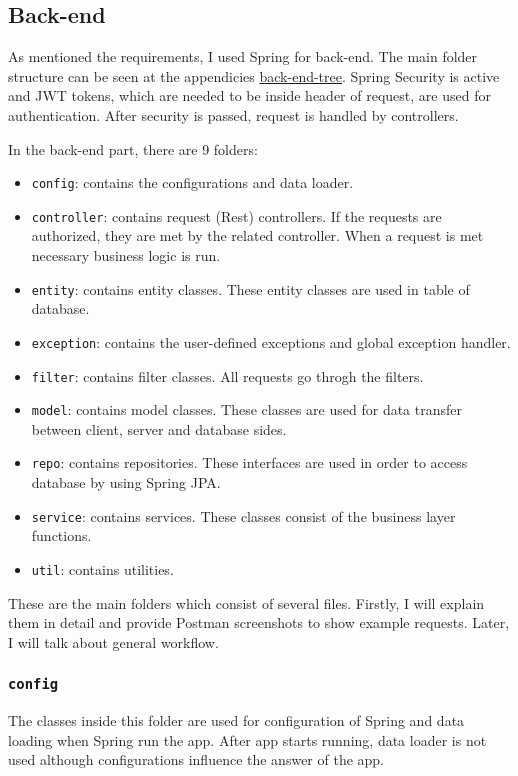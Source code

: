 \subsection{Back-end}

As mentioned the requirements, I used Spring for back-end. The main folder structure can be seen at the appendicies \hyperref[back-end-tree]{back-end-tree}. Spring Security is active and JWT tokens, which are needed to be inside header of request, are used for authentication. After security is passed, request is handled by controllers.

In the back-end part, there are 9 folders:
\begin{itemize}
  \item \texttt{config}: contains the configurations and data loader.
  \item \texttt{controller}: contains request (Rest) controllers. If the requests are authorized, they are met by the related controller. When a request is met necessary business logic is run.
  \item \texttt{entity}: contains entity classes. These entity classes are used in table of database.
  \item \texttt{exception}: contains the user-defined exceptions and global exception handler.
  \item \texttt{filter}: contains filter classes. All requests go throgh the filters.
  \item \texttt{model}: contains model classes. These classes are used for data transfer between client, server and database sides.
  \item \texttt{repo}: contains repositories. These interfaces are used in order to access database by using Spring JPA.
  \item \texttt{service}: contains services. These classes consist of the business layer functions.
  \item \texttt{util}: contains utilities.
\end{itemize}
These are the main folders which consist of several files. Firstly, I will explain them in detail and provide Postman screenshots to show example requests. Later, I will talk about general workflow.


\subsubsection{\texttt{config}}

The classes inside this folder are used for configuration of Spring and data loading when Spring run the app. After app starts running, data loader is not used although configurations influence the answer of the app.


